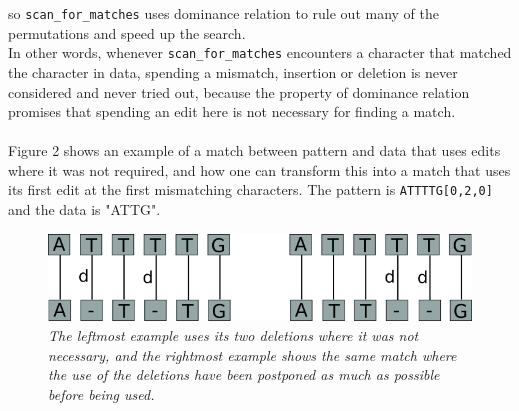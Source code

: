 \documentclass[12pt]{article}
\newcommand{\scm}{\texttt{scan\_for\_matches} }
\begin{document}
so \scm uses dominance relation to rule out many of the permutations and speed up the search. \\
In other words, whenever \scm
encounters a character that matched the character in data, spending a mismatch, insertion or deletion is never
considered and never tried out, because the property of dominance relation promises that spending an edit
here is not necessary for finding a match. \\ \\
Figure 2 shows an example of a match between pattern and data that uses edits where it was not required,
and how one can transform this into a match that uses its first edit at the first mismatching characters.
The pattern is \texttt{ATTTTG[0,2,0]} and the data is "ATTG".
\begin{figure}
\begin{center}
\includegraphics[scale=0.6]{Diagrams/shunt.png}
\end{center}
\caption{\textit{The leftmost example uses its two deletions where it was not necessary, and the rightmost example shows
the same match where the use of the deletions have been postponed as much as possible before being used.}}
\end{figure}
%
%
%
%
\end{document}
